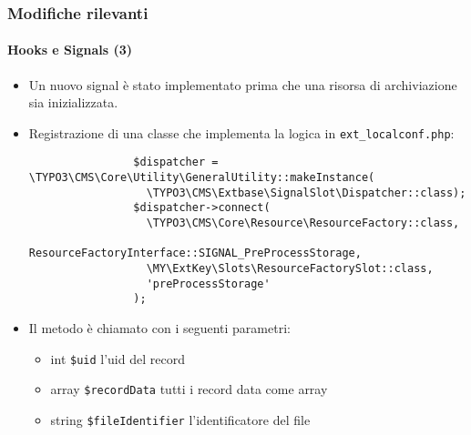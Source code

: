 \begin{frame}[fragile]
	\frametitle{Modifiche rilevanti}
	\framesubtitle{Hooks e Signals (3)}

	\lstset{basicstyle=\tiny\ttfamily}

	\begin{itemize}

		\item Un nuovo signal è stato implementato prima che una risorsa di archiviazione sia inizializzata.

		\item Registrazione di una classe che implementa la logica in \texttt{ext\_localconf.php}:

			\begin{lstlisting}
				$dispatcher = \TYPO3\CMS\Core\Utility\GeneralUtility::makeInstance(
				  \TYPO3\CMS\Extbase\SignalSlot\Dispatcher::class);
				$dispatcher->connect(
				  \TYPO3\CMS\Core\Resource\ResourceFactory::class,
				  ResourceFactoryInterface::SIGNAL_PreProcessStorage,
				  \MY\ExtKey\Slots\ResourceFactorySlot::class,
				  'preProcessStorage'
				);
			\end{lstlisting}

		\item Il metodo è chiamato con i seguenti parametri:

			\begin{itemize}
				\item int \texttt{\$uid} l'uid del record
				\item array \texttt{\$recordData} tutti i record data come array
				\item string \texttt{\$fileIdentifier} l'identificatore del file
			\end{itemize}

	\end{itemize}

\end{frame}

